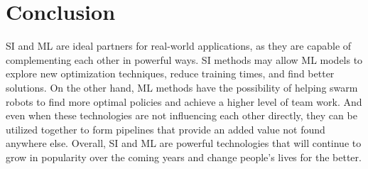 \documentclass[twocolumn]{bmcart}%
\begin{document}
\section*{Conclusion}
SI and ML are ideal partners for real-world applications, as they are capable of complementing each other in powerful ways. SI methods may allow ML models to explore new optimization techniques, reduce training times, and find better solutions. On the other hand, ML methods have the possibility of helping swarm robots to find more optimal policies and achieve a higher level of team work. And even when these technologies are not influencing each other directly, they can be utilized together to form pipelines that provide an added value not found  anywhere else. Overall, SI and ML are powerful technologies that will continue to grow in popularity over the coming years and change people's lives for the better.  
\end{document}
